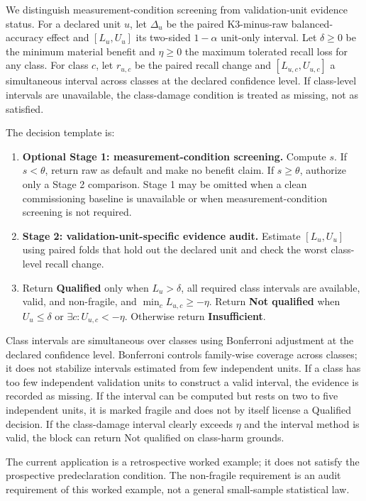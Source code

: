 \documentclass[11pt]{article}
\begin{document}
We distinguish measurement-condition screening from validation-unit evidence
status. For a declared unit $u$, let $\Delta_u$ be the paired
K3-minus-raw balanced-accuracy effect and $[L_u,U_u]$ its two-sided $1-\alpha$
unit-only interval. Let $\delta\geq 0$ be the minimum material benefit and
$\eta\geq 0$ the maximum tolerated recall loss for any class. For class $c$,
let $r_{u,c}$ be the paired recall change and $[L_{u,c},U_{u,c}]$ a
simultaneous interval across classes at the declared confidence level. If
class-level intervals are unavailable, the class-damage condition is treated as
missing, not as satisfied.

The decision template is:

\begin{enumerate}
  \item \textbf{Optional Stage 1: measurement-condition screening.} Compute
  $s$. If $s<\theta$, return raw as default and make no benefit claim. If
  $s\geq\theta$, authorize only a Stage 2 comparison. Stage 1 may be omitted
  when a clean commissioning baseline is unavailable or when
  measurement-condition screening is not required.
  \item \textbf{Stage 2: validation-unit-specific evidence audit.} Estimate
  $[L_u,U_u]$ using paired folds that hold out the declared unit and check the
  worst class-level recall change.
  \item Return \textbf{Qualified} only when $L_u>\delta$, all required class
  intervals are available, valid, and non-fragile, and
  $\min_c L_{u,c}\geq-\eta$. Return \textbf{Not qualified} when
  $U_u\leq\delta$ or $\exists c: U_{u,c}<-\eta$. Otherwise return
  \textbf{Insufficient}.
\end{enumerate}

Class intervals are simultaneous over classes using Bonferroni adjustment at
the declared confidence level. Bonferroni controls family-wise coverage across
classes; it does not stabilize intervals estimated from few independent units.
If a class has too few independent validation units to construct a valid
interval, the evidence is recorded as missing. If the interval can be computed
but rests on two to five independent units, it is marked fragile and does not
by itself license a Qualified decision. If the class-damage interval clearly
exceeds $\eta$ and the interval method is valid, the block can return Not
qualified on class-harm grounds.

The current application is a retrospective worked example; it does not satisfy
the prospective predeclaration condition. The non-fragile requirement is an
audit requirement of this worked example, not a general small-sample
statistical law.
\end{document}
